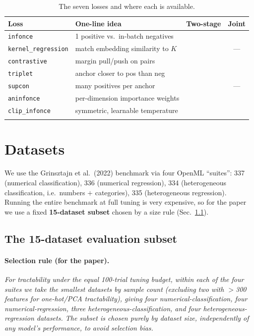 \documentclass[11pt]{article}
\newcommand{\code}[1]{\texttt{#1}}
\newcommand{\K}{K}
\newcommand{\yes}{\checkmark}
\begin{document}
\begin{longtable}{@{}p{3.0cm} p{6.2cm} c c@{}}
\toprule
\textbf{Loss} & \textbf{One-line idea} & \textbf{Two-stage} & \textbf{Joint} \\
\midrule
\endhead
\code{infonce} & 1 positive vs.\ in-batch negatives & \yes & \yes \\
\code{kernel\_regression} & match embedding similarity to $\K$ & \yes & --- \\
\code{contrastive} & margin pull/push on pairs & \yes & \yes \\
\code{triplet} & anchor closer to pos than neg & \yes & \yes \\
\code{supcon} & many positives per anchor & \yes & --- \\
\code{aninfonce} & per-dimension importance weights & \yes & \yes \\
\code{clip\_infonce} & symmetric, learnable temperature & \yes & \yes \\
\bottomrule
\caption{The seven losses and where each is available.}
\label{tab:losses}
\end{longtable}

\section{Datasets}
We use the Grinsztajn et al.\ (2022) benchmark via four OpenML ``suites'': 337
(numerical classification), 336 (numerical regression), 334 (heterogeneous
classification, i.e.\ numbers $+$ categories), 335 (heterogeneous regression).
Running the entire benchmark at full tuning is very expensive, so for the paper we
use a fixed \textbf{15-dataset subset} chosen by a size rule
(Sec.~\ref{sec:subset}).

\subsection{The 15-dataset evaluation subset}\label{sec:subset}
\paragraph{Selection rule (for the paper).} \emph{For tractability under the equal
100-trial tuning budget, within each of the four suites we take the smallest
datasets by sample count (excluding two with $>$300 features for one-hot/PCA
tractability), giving four numerical-classification, four numerical-regression,
three heterogeneous-classification, and four heterogeneous-regression datasets.
The subset is chosen purely by dataset size, independently of any model's
performance, to avoid selection bias.}
\end{document}
